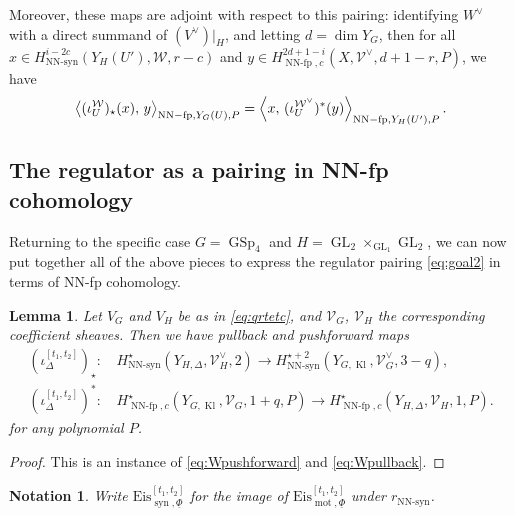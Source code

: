 \documentclass[cjm]{ipart}
\theoremstyle{plain}
\newtheorem{lemma}[theorem]{Lemma}
\newtheorem{definition}[theorem]{Definition}
\newtheorem{notation}[theorem]{Notation}
\theoremstyle{remark}
\DeclareMathOperator{\GL}{GL}
\DeclareMathOperator{\GSp}{GSp}
\DeclareMathOperator{\Kl}{Kl}
\DeclareMathOperator{\mot}{mot}
\DeclareMathOperator{\NNfp}{NN-fp}
\DeclareMathOperator{\NNsyn}{NN-syn}
\DeclareMathOperator{\syn}{syn}
\newcommand{\Af}{\AA_{\mathrm{f}}}
\newcommand{\Eis}{\mathrm{Eis}}
\newcommand{\QQ}{\mathbf{Q}}
\newcommand{\cV}{\mathcal{V}}
\newcommand{\cW}{\mathcal{W}}
\newcommand{\sH}{\mathscr{H}}
\renewcommand{\AA}{\mathbf{A}}
\numberwithin{equation}{subsection}
\begin{document}
   Moreover, these maps  are adjoint with respect to this pairing: identifying $W^\vee$ with a direct summand of $(V^\vee)|_H$, and letting $d = \dim Y_G$, then for all $x\in H^{i-2c}_{\NNsyn}(Y_H(U'),\cW,r-c)$ and $y\in  H^{2d+1-i}_{\NNfp, c}(X, \cV^\vee,d+1-r, P)$, we have
   \[ \left\langle (\iota_U^{\cW})_\star(x),\, y\right\rangle_{\NNfp,Y_G(U),P} = \left\langle x,\, (\iota_U^{\cW^\vee})^*(y)\right\rangle_{\NNfp,Y_H(U'),P}.\qedhere\]


 \subsection{The regulator as a pairing in NN-fp cohomology}\label{sect:reduction1}

  Returning to the specific case $G = \GSp_4$ and $H = \GL_2 \times_{\GL_1} \GL_2$, we can now put together all of the above pieces to express the regulator pairing \eqref{eq:goal2} in terms of NN-fp cohomology.

%


  \begin{lemma}
   Let $V_G$ and $V_H$ be as in \cref{eq:qrtetc}, and $\cV_G$, $\cV_H$ the corresponding coefficient sheaves. Then we have pullback and pushforward maps
   \begin{align}
     (\iota^{[t_1,t_2]}_\Delta)_\star:&\, H^\star_{\NNsyn}(Y_{H,\Delta}, \cV_H^\vee, 2)  \to H^{\star+2}_{\NNsyn}(Y_{G,\Kl},\cV_G^\vee, 3-q), \label{eq:s1s2pushforward}  \\
      (\iota^{[t_1,t_2]}_\Delta)^*:& \, H^{\star}_{\NNfp,c}(Y_{G,\Kl},\cV_G, 1 + q, P)  \to  H^\star_{\NNfp,c}(Y_{H,\Delta}, \cV_H, 1, P) \label{eq:s1s2pullback}.
   \end{align}
   for any polynomial $P$.
  \end{lemma}
  \begin{proof}
   This is an instance of \eqref{eq:Wpushforward} and \eqref{eq:Wpullback}.
  \end{proof}

  \begin{notation}
   Write $\Eis^{[t_1,t_2]}_{\syn,\underline\Phi}$ for the image of $\Eis^{[t_1,t_2]}_{\mot,\underline\Phi}$ under $r_{\NNsyn}$.
  \end{notation}
\end{document}
